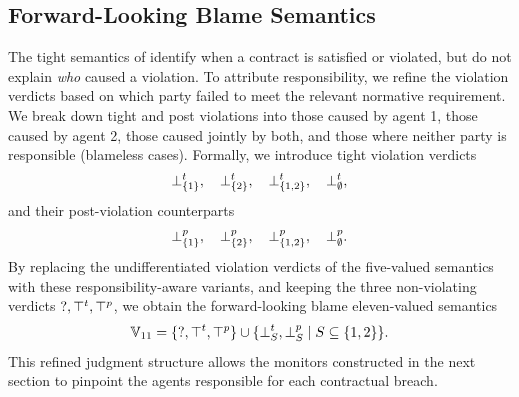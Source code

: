 \subsection{Forward-Looking Blame Semantics}
The tight semantics of \cDL identify when a contract is satisfied or violated, but do not explain \emph{who} caused a violation.  
To attribute responsibility, we refine the violation verdicts based on which party failed to meet the relevant normative requirement.  
We break down tight and post violations into those caused by agent 1, those caused by agent 2, those caused jointly by both, and those where neither party is responsible (blameless cases).  
Formally, we introduce tight violation verdicts
\[
\mathbin{\bot^{t}_{\{1\}}},\quad \mathbin{\bot^{t}_{\{2\}}},\quad \mathbin{\bot^{t}_{\{1,2\}}},\quad \mathbin{\bot^{t}_{\emptyset}},
\]
and their post-violation counterparts
\[
\mathbin{\bot^{p}_{\{1\}}},\quad \mathbin{\bot^{p}_{\{2\}}},\quad \mathbin{\bot^{p}_{\{1,2\}}},\quad \mathbin{\bot^{p}_{\emptyset}}.
\]
By replacing the undifferentiated violation verdicts of the five-valued semantics with these responsibility-aware variants, and keeping the three non-violating verdicts \(\mathsf{?},\top^t,\top^p\), we obtain the forward-looking blame eleven-valued semantics
\[
  \mathbb{V}_{11} = \{\mathsf{?},\top^t,\top^p\} \cup \{\bot^{t}_{S},\bot^{p}_{S} \mid S\subseteq \{1,2\}\}.
  \]
This refined judgment structure allows the monitors constructed in the next section to pinpoint the agents responsible for each contractual breach.


